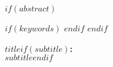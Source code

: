 \doublespacing

$if(abstract)$
  \begin{abstract}
    \noindent $abstract$
  \end{abstract}
  \vspace{\baselineskip}
  $if(keywords)$
    \indent {}
  $endif$
  \newpage
$endif$

\begin{center}
  \singlespacing
  \textbf{$title$$if(subtitle)$:\\$subtitle$$endif$}
\end{center}


\linenumbers
